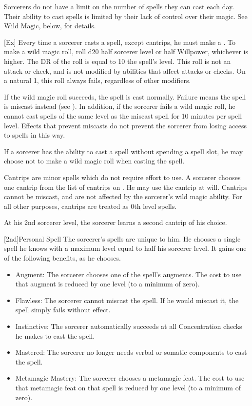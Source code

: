         Sorcerers do not have a limit on the number of spells they can cast each day.
        Their ability to cast spells is limited by their lack of control over their magic.
        See Wild Magic, below, for details.

        [Ex]\label{Wild Magic}
        Every time a sorcerer casts a spell, except cantrips, he must make a .
        To make a wild magic roll, roll d20 \add half sorcerer level or half Willpower, whichever is higher.
        The DR of the roll is equal to 10 \add the spell's level.
        This roll is not an attack or check, and is not modified by abilities that affect attacks or checks.
        On a natural 1, this roll always fails, regardless of other modifiers.

        If the wild magic roll succeeds, the spell is cast normally.
        Failure means the spell is miscast instead (see ).
        In addition, if the sorcerer fails a wild magic roll, he cannot cast spells of the same level as the miscast spell for 10 minutes per spell level.
        Effects that prevent miscasts do not prevent the sorcerer from losing access to spells in this way.

        If a sorcerer has the ability to cast a spell without spending a spell slot, he may choose not to make a wild magic roll when casting the spell.

        Cantrips are minor spells which do not require effort to use.
        A sorcerer chooses one cantrip from the list of cantrips on .
        He may use the cantrip at will.
        Cantrips cannot be miscast, and are not affected by the sorcerer's wild magic ability.
        For all other purposes, cantrips are treated as 0th level spells.

        At his 2nd sorcerer level, the sorcerer learns a second cantrip of his choice.

        [2nd]{Personal Spell}
        The sorcerer's spells are unique to him.
        He chooses a single spell he knows with a maximum level equal to half his sorcerer level.
        It gains one of the following benefits, as he chooses.
        \begin{itemize}
            \item Augment: The sorcerer chooses one of the spell's augments.
                The cost to use that augment is reduced by one level (to a minimum of zero).
            \item Flawless: The sorcerer cannot miscast the spell.
                If he would miscast it, the spell simply fails without effect.
            \item Instinctive: The sorcerer automatically succeeds at all Concentration checks he makes to cast the spell.
            \item Mastered: The sorcerer no longer needs verbal or somatic components to cast the spell.
            \item Metamagic Mastery: The sorcerer chooses a metamagic feat.
                The cost to use that metamagic feat on that spell is reduced by one level (to a minimum of zero).
        \end{itemize}

